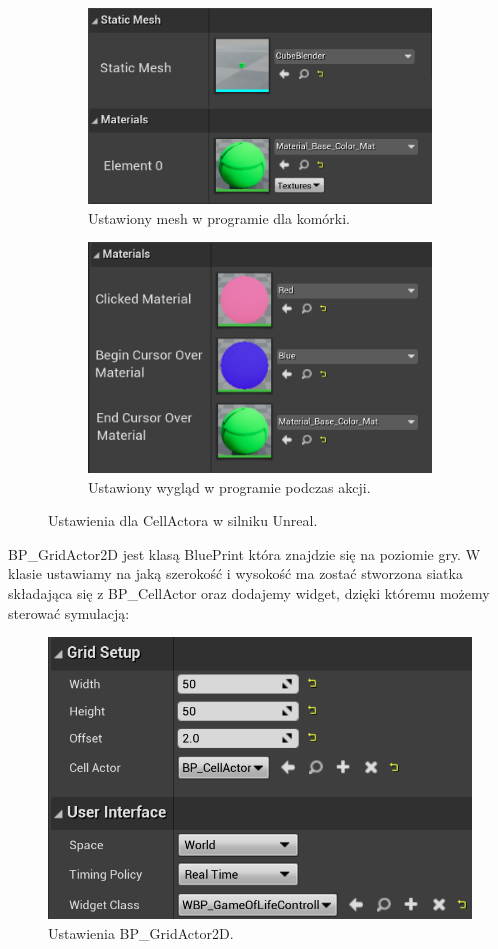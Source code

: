 \documentclass[a4paper,12pt,reqno]{article}
\begin{document}
\begin{figure}[!ht]%
	\centering
	\begin{subfigure}{.7\textwidth}
		\centering
		\includegraphics[width=0.8\linewidth]{graphics/gameoflife/CellActorInUE_1.png}
		\caption{Ustawiony mesh w programie dla komórki.}	
		\label{ref:subref_a}
	\end{subfigure}%
	
	\begin{subfigure}{.7\textwidth}
		\centering
		\includegraphics[width=0.8\linewidth]{graphics/gameoflife/CellActorInUE_2.png}
		\caption{Ustawiony wygląd w programie podczas akcji.}
		\label{ref:subref_b}
	\end{subfigure}%
	

\caption{Ustawienia dla CellActora w silniku Unreal.}
\label{ref:ref}
\end{figure}

BP\_GridActor2D jest klasą BluePrint która znajdzie się na poziomie gry. W klasie ustawiamy na jaką szerokość i wysokość ma zostać stworzona siatka składająca się z BP\_CellActor oraz dodajemy widget, dzięki któremu możemy sterować symulacją:

\begin{figure}[!ht]%
\centering
\includegraphics[width=0.6\columnwidth]{graphics/gameoflife/GridActor2DInUE_1.png}
\caption{Ustawienia BP\_GridActor2D.
\label{BPExample}}%
%
\qquad
\end{figure}  
\end{document}
